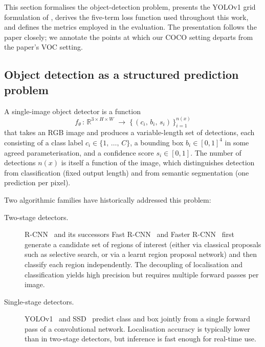 \label{sec:theoretical_framework}

This section formalises the object-detection problem, presents the YOLOv1
grid formulation of \citet{redmon2016you}, derives the five-term loss
function used throughout this work, and defines the metrics employed in the
evaluation. The presentation follows the paper closely; we annotate the
points at which our COCO setting departs from the paper's VOC setting.

\subsection{Object detection as a structured prediction problem}
\label{sec:theory:detection-problem}

A single-image object detector is a function
\[
  f_{\theta}\,:\,\mathbb{R}^{3 \times H \times W}\;\longrightarrow\;\bigl\{\,(c_i,\,b_i,\,s_i)\,\bigr\}_{i=1}^{n(x)}
\]
that takes an RGB image and produces a variable-length set of detections,
each consisting of a class label $c_i \in \{1,\,\ldots,\,C\}$, a bounding box
$b_i \in [0,1]^4$ in some agreed parameterisation, and a confidence score
$s_i \in [0,1]$. The number of detections $n(x)$ is itself a function of the
image, which distinguishes detection from classification (fixed output
length) and from semantic segmentation (one prediction per pixel).

Two algorithmic families have historically addressed this problem:

\begin{description}
    \item[Two-stage detectors.] R-CNN~\citep{girshick2014rich} and its
        successors Fast R-CNN~\citep{girshick2015fast} and
        Faster R-CNN~\citep{ren2015faster} first generate a candidate set of
        regions of interest (either via classical proposals such as selective
        search, or via a learnt region proposal network) and then classify
        each region independently. The decoupling of localisation and
        classification yields high precision but requires multiple forward
        passes per image.
    \item[Single-stage detectors.] YOLOv1~\citep{redmon2016you} and
        SSD~\citep{liu2016ssd} predict class and box jointly from a single
        forward pass of a convolutional network. Localisation accuracy is
        typically lower than in two-stage detectors, but inference is fast
        enough for real-time use.
\end{description}

